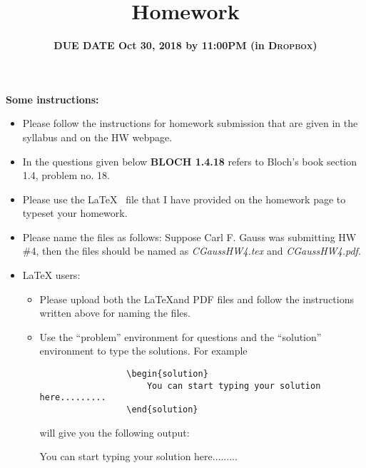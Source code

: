 \documentclass[11pt]{article}
\title{\textbf{\mycourse} \hfill Homework \hwnumber \hfill \textbf{\semesteryear}} %
\author{\myname} %
\date{ \textbf{DUE DATE Oct 30, 2018 {\red by 11:00PM (in \textsc{Dropbox})}}} %
\newcommand{\hwnumber}{4} %
\begin{document}
\thispagestyle{empty} %
\renewcommand{\arraystretch}{1} %

\clearpage %
\textbf{Some instructions:}
\begin{itemize}
    \item Please follow the instructions for homework submission that are given in the syllabus and on the HW webpage.
    \item In the questions given below \textsf{\bf BLOCH 1.4.18} refers to Bloch's book section 1.4, problem no. 18.
    \item Please use the \LaTeX~ file that I have provided on the homework page to typeset your homework.
    \item Please name the files as follows: Suppose Carl F. Gauss was submitting HW \#\hwnumber, then the files should be named as \textit{CGaussHW\hwnumber.tex} and \textit{CGaussHW\hwnumber.pdf}.
    \item \LaTeX{} users:
       \begin{itemize}
            \item Please upload both the \LaTeX and PDF files and follow the instructions written above for naming the files.
            \item Use the {\blue ``problem'' environment} for questions and the {\blue ``solution'' environment} to type the solutions. For example
            {\magenta
            \begin{verbatim}
                 \begin{solution}
                     You can start typing your solution here.........
                 \end{solution}
            \end{verbatim}
            }
             will give you the following output:

                \begin{solution}
                You can start typing your solution here.........
                \end{solution}


\end{itemize}
\end{itemize}
\end{document}
